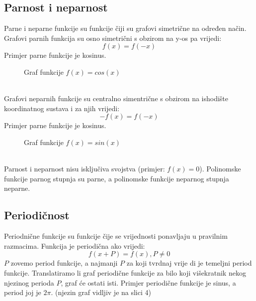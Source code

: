 \subsection{Parnost i neparnost \label{par}}
    Parne i neparne funkcije su funkcije čiji su grafovi simetrične na određen način.
    Grafovi parnih funkcija su osno simetrični s obzirom na y-os pa vrijedi:
    \[f(x) = f(-x)\]
    Primjer parne funkcije je kosinus.
    \begin{figure}[ht]
        \centering
        \caption{Graf funkcije \(f(x) = cos(x)\)} 
        \label{fig:template}
    \end{figure}
    \\
    Grafovi neparnih funkcije su centralno simentrične s obzirom na ishodište koordinatnog sustava i za njih vrijedi:
    \[-f(x) = f(-x)\]
    \clearpage
    \noindent Primjer parne funkcije je kosinus.
    \begin{figure}[ht]
        \centering
        \caption{Graf funkcije \(f(x) = sin(x)\)} 
        \label{fig:template}
    \end{figure}
    \\
    Parnost i neparnost nisu isključiva svojstva (primjer: \(f(x) = 0\)).
    Polinomske funkcije parnog stupnja su parne, a polinomske funkcije neparnog stupnja neparne.

\subsection{Periodičnost}
    Periodnične funkcije su funkcije čije se vrijednosti ponavljaju u pravilnim razmacima.
    Funkcija je periodična ako vrijedi:
    \[f(x + P) = f(x), P \neq 0\]
    \(P\) zovemo period funkcije, a najmanji \(P\) za koji tvrdnaj vrije    di je temeljni period funkcije.
    Translatiramo li graf periodične funkcije za bilo koji višekratnik nekog njezinog perioda \(P\), graf će ostati isti.
    Primjer periodične funkcije je sinus, a period joj je \(2 \pi\). (njezin graf vidljiv je na slici 4)

